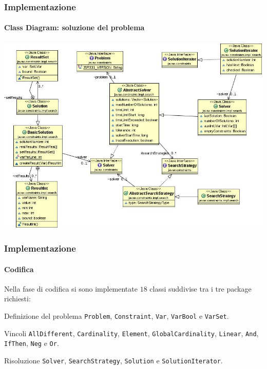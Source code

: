 \documentclass{beamer}
\begin{document}
\begin{frame}
\frametitle{Implementazione}
\framesubtitle{Class Diagram: soluzione del problema}
\begin{center}
\includegraphics[scale=0.32]{../relazione/img/Soluzione.JPG}
\end{center}
\end{frame}

\begin{frame}
\frametitle{Implementazione}
\framesubtitle{Codifica}
Nella fase di codifica si sono implementate $18$ classi suddivise tra i
tre package richiesti:
\pause
\begin{block}{Definizione del problema}
\texttt{Problem}, \texttt{Constraint}, \texttt{Var}, \texttt{VarBool} e
\texttt{VarSet}.
\end{block}
\pause
\begin{block}{Vincoli}
\texttt{AllDifferent}, \texttt{Cardinality}, \texttt{Element},
\texttt{GlobalCardinality}, \texttt{Linear}, \texttt{And},
 \texttt{IfThen}, \texttt{Neg} e \texttt{Or}.
\end{block}
\pause
\begin{block}{Risoluzione}
\texttt{Solver}, \texttt{SearchStrategy}, \texttt{Solution} e
\texttt{SolutionIterator}.
\end{block}
\end{frame}
\end{document}
